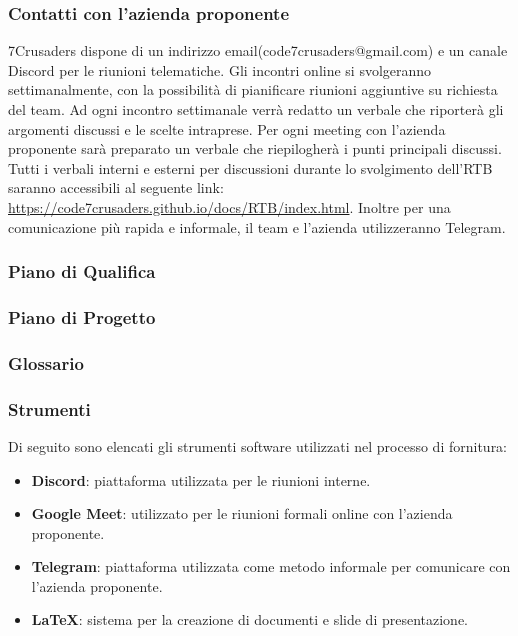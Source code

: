 \subsubsection{Contatti con l’azienda proponente}
7Crusaders dispone di un indirizzo email(code7crusaders@gmail.com) e un canale Discord per le riunioni telematiche. 
Gli incontri online si svolgeranno settimanalmente, con la possibilità di pianificare riunioni aggiuntive su richiesta del team.
Ad ogni incontro settimanale verrà redatto un verbale che riporterà gli argomenti discussi e le scelte intraprese.
Per ogni meeting con l’azienda proponente sarà preparato un verbale che riepilogherà i punti principali discussi. 
Tutti i verbali interni e esterni per discussioni durante lo svolgimento dell'RTB saranno accessibili al seguente link: \url{https://code7crusaders.github.io/docs/RTB/index.html}.
Inoltre per una comunicazione più rapida e informale, il team e l'azienda utilizzeranno Telegram.



\subsubsection{Piano di Qualifica}

\subsubsection{Piano di Progetto}

\subsubsection{Glossario}

\subsubsection{Strumenti}
Di seguito sono elencati gli strumenti software utilizzati nel processo di fornitura:
\begin{itemize}
    \item \textbf{Discord}: piattaforma utilizzata per le riunioni interne.
    \item \textbf{Google Meet}: utilizzato per le riunioni formali online con l'azienda proponente.
    \item \textbf{Telegram}: piattaforma utilizzata come metodo informale per comunicare con l'azienda proponente.
    \item \textbf{LaTeX}: sistema per la creazione di documenti e slide di presentazione.
\end{itemize}








